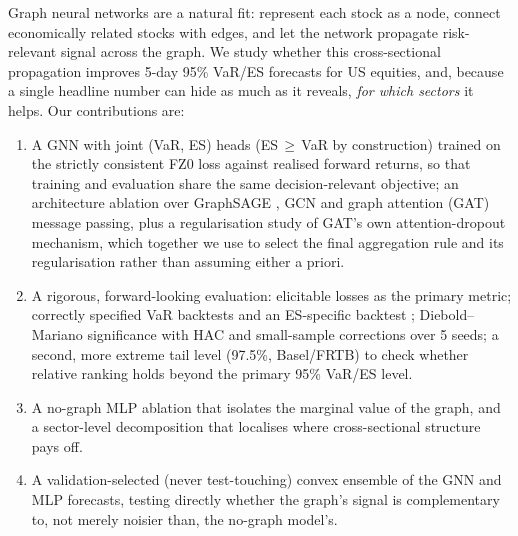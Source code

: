 \documentclass{llncs}
\newcommand{\nSeeds}{5}
\begin{document}
Graph neural networks \citep{kipf2017,hamilton2017} are a natural fit: represent
each stock as a node, connect economically related stocks with edges, and let
the network propagate risk-relevant signal across the graph. We study whether
this cross-sectional propagation improves 5-day 95\% VaR/ES forecasts for US
equities, and, because a single headline number can hide as much as it
reveals, \emph{for which sectors} it helps. Our contributions are:
\begin{enumerate}
  \item A GNN with joint (VaR, ES) heads (ES\,$\ge$\,VaR by construction)
    trained on the strictly consistent FZ0 loss \citep{fissler2016,patton2019}
    against realised forward returns, so that training and evaluation share
    the same decision-relevant objective; an architecture ablation over
    GraphSAGE \citep{hamilton2017}, GCN \citep{kipf2017} and graph attention
    (GAT) \citep{velickovic2018} message passing, plus a regularisation study
    of GAT's own attention-dropout mechanism, which together we use to select
    the final aggregation rule and its regularisation rather than assuming
    either a priori.
  \item A rigorous, forward-looking evaluation: elicitable losses as the primary
    metric; correctly specified VaR backtests \citep{kupiec1995,christoffersen1998}
    and an ES-specific backtest \citep{acerbi2014}; Diebold--Mariano significance
    \citep{diebold1995} with HAC \citep{newey1987} and small-sample
    \citep{harvey1997} corrections over \nSeeds{} seeds; a second, more extreme
    tail level (97.5\%, Basel/FRTB) to check whether relative ranking holds
    beyond the primary 95\% VaR/ES level.
  \item A no-graph MLP ablation that isolates the marginal value of the graph,
    and a sector-level decomposition that localises where cross-sectional
    structure pays off.
  \item A validation-selected (never test-touching) convex ensemble of the
    GNN and MLP forecasts, testing directly whether the graph's signal is
    complementary to, not merely noisier than, the no-graph model's.
\end{enumerate}
\end{document}
